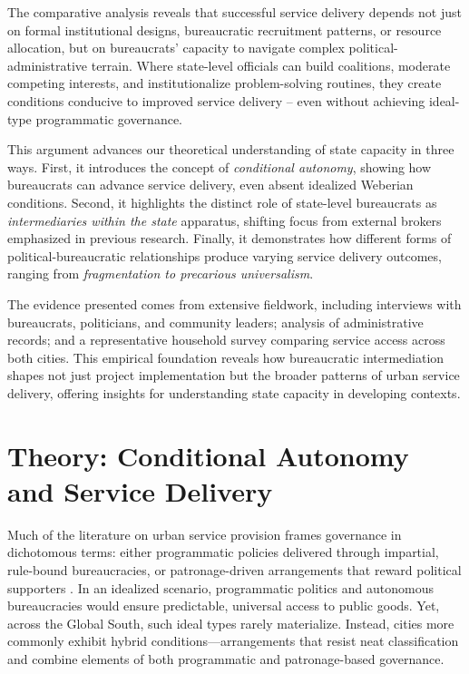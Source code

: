 The comparative analysis reveals that successful service delivery depends not just on formal institutional designs, bureaucratic recruitment patterns, or resource allocation, but on bureaucrats' capacity to navigate complex political-administrative terrain. Where state-level officials can build coalitions, moderate competing interests, and institutionalize problem-solving routines, they create conditions conducive to improved service delivery – even without achieving ideal-type programmatic governance.

This argument advances our theoretical understanding of state capacity in three ways. First, it introduces the concept of \textit{conditional autonomy}, showing how bureaucrats can advance service delivery, even absent idealized Weberian conditions. Second, it highlights the distinct role of state-level bureaucrats as \textit{intermediaries within the state} apparatus, shifting focus from external brokers emphasized in previous research. Finally, it demonstrates how different forms of political-bureaucratic relationships produce varying service delivery outcomes, ranging from \textit{fragmentation to precarious universalism}.

The evidence presented comes from extensive fieldwork, including interviews with bureaucrats, politicians, and community leaders; analysis of administrative records; and a representative household survey comparing service access across both cities. This empirical foundation reveals how bureaucratic intermediation shapes not just project implementation but the broader patterns of urban service delivery, offering insights for understanding state capacity in developing contexts.


\section{Theory: Conditional Autonomy and Service Delivery}

Much of the literature on urban service provision frames governance in dichotomous terms: either programmatic policies delivered through impartial, rule-bound bureaucracies, or patronage-driven arrangements that reward political supporters \citep{pepinsky_bureaucracy_2017, kitschelt_patrons_2007-1}. In an idealized scenario, programmatic politics and autonomous bureaucracies would ensure predictable, universal access to public goods. Yet, across the Global South, such ideal types rarely materialize. Instead, cities more commonly exhibit hybrid conditions—arrangements that resist neat classification and combine elements of both programmatic and patronage-based governance.

